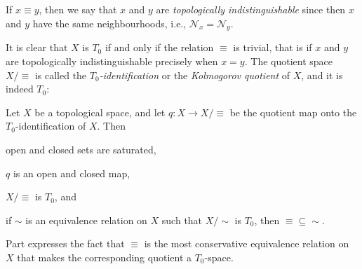 \documentclass[article, a4paper, 11pt, oneside]{memoir}
\numberwithin{equation}{chapter}
\newcommand{\calN}{\mathcal{N}}
\newcommand{\nhoodfilter}[1]{\calN_{#1}}
\begin{document}
If $x \equiv y$, then we say that $x$ and $y$ are \emph{topologically indistinguishable} since then $x$ and $y$ have the same neighbourhoods, i.e., $\nhoodfilter{x} = \nhoodfilter{y}$.

It is clear that $X$ is $T_0$ if and only if the relation $\equiv$ is trivial, that is if $x$ and $y$ are topologically indistinguishable precisely when $x = y$. The quotient space $X/{\equiv}$ is called the \emph{$T_0$-identification} or the \emph{Kolmogorov quotient} of $X$, and it is indeed $T_0$:

\begin{theorem}
    Let $X$ be a topological space, and let $q \colon X \to X/{\equiv}$ be the quotient map onto the $T_0$-identification of $X$. Then
    \begin{enumthm}
        \item \label{enum:T0-identification-saturated} open and closed sets are saturated,
        \item \label{enum:T0-quotient-map-open-closed} $q$ is an open and closed map,
        \item $X/{\equiv}$ is $T_0$, and
        \item \label{enum:T0-identification-is-smallest-equiv} if $\sim$ is an equivalence relation on $X$ such that $X/{\sim}$ is $T_0$, then ${\equiv} \subseteq {\sim}$.\footnotemark
    \end{enumthm}
\end{theorem}
%
Part  expresses the fact that $\equiv$ is the most conservative equivalence relation on $X$ that makes the corresponding quotient a $T_0$-space.
\end{document}
